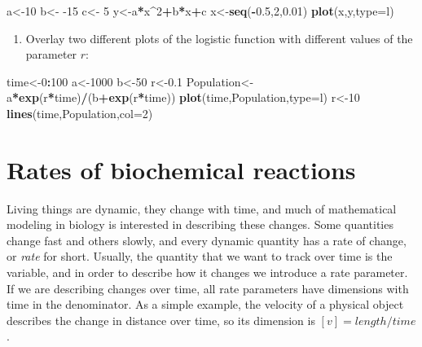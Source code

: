 \documentclass[
]{book}
\newenvironment{Shaded}{\begin{snugshade}}{\end{snugshade}}
\newcommand{\DataTypeTok}[1]{\textcolor[rgb]{0.13,0.29,0.53}{#1}}
\newcommand{\DecValTok}[1]{\textcolor[rgb]{0.00,0.00,0.81}{#1}}
\newcommand{\FloatTok}[1]{\textcolor[rgb]{0.00,0.00,0.81}{#1}}
\newcommand{\KeywordTok}[1]{\textcolor[rgb]{0.13,0.29,0.53}{\textbf{#1}}}
\newcommand{\NormalTok}[1]{#1}
\newcommand{\OperatorTok}[1]{\textcolor[rgb]{0.81,0.36,0.00}{\textbf{#1}}}
\newcommand{\StringTok}[1]{\textcolor[rgb]{0.31,0.60,0.02}{#1}}
\providecommand{\tightlist}{%
  \setlength{\itemsep}{0pt}\setlength{\parskip}{0pt}}
\theoremstyle{definition}
\theoremstyle{definition}
\theoremstyle{definition}
\theoremstyle{remark}
\begin{document}
\begin{Shaded}
\begin{Highlighting}[]
\NormalTok{a\textless{}{-}}\DecValTok{10}
\NormalTok{b\textless{}{-}}\StringTok{ }\DecValTok{{-}15}
\NormalTok{c\textless{}{-}}\StringTok{ }\DecValTok{5}
\NormalTok{y\textless{}{-}a}\OperatorTok{*}\NormalTok{x}\OperatorTok{\^{}}\DecValTok{2}\OperatorTok{+}\NormalTok{b}\OperatorTok{*}\NormalTok{x}\OperatorTok{+}\NormalTok{c}
\NormalTok{x\textless{}{-}}\KeywordTok{seq}\NormalTok{(}\OperatorTok{{-}}\FloatTok{0.5}\NormalTok{,}\DecValTok{2}\NormalTok{,}\FloatTok{0.01}\NormalTok{) }
\KeywordTok{plot}\NormalTok{(x,y,}\DataTypeTok{type=}\StringTok{\textquotesingle{}l\textquotesingle{}}\NormalTok{)}
\end{Highlighting}
\end{Shaded}

\begin{enumerate}
\def\labelenumi{\arabic{enumi}.}
\setcounter{enumi}{5}
\tightlist
\item
  Overlay two different plots of the logistic function with different values of the parameter \(r\):
\end{enumerate}

\begin{Shaded}
\begin{Highlighting}[]
\NormalTok{time\textless{}{-}}\DecValTok{0}\OperatorTok{:}\DecValTok{100}
\NormalTok{a\textless{}{-}}\DecValTok{1000}
\NormalTok{b\textless{}{-}}\DecValTok{50} 
\NormalTok{r\textless{}{-}}\FloatTok{0.1}
\NormalTok{Population\textless{}{-}a}\OperatorTok{*}\KeywordTok{exp}\NormalTok{(r}\OperatorTok{*}\NormalTok{time)}\OperatorTok{/}\NormalTok{(b}\OperatorTok{+}\KeywordTok{exp}\NormalTok{(r}\OperatorTok{*}\NormalTok{time)) }
\KeywordTok{plot}\NormalTok{(time,Population,}\DataTypeTok{type=}\StringTok{\textquotesingle{}l\textquotesingle{}}\NormalTok{) }
\NormalTok{r\textless{}{-}}\DecValTok{10} 
\KeywordTok{lines}\NormalTok{(time,Population,}\DataTypeTok{col=}\DecValTok{2}\NormalTok{)}
\end{Highlighting}
\end{Shaded}

\hypertarget{rates-of-biochemical-reactions}{%
\section{Rates of biochemical reactions}\label{rates-of-biochemical-reactions}}

\label{sec:bio2}

Living things are dynamic, they change with time, and much of mathematical modeling in biology is interested in describing these changes. Some quantities change fast and others slowly, and every dynamic quantity has a rate of change, or \emph{rate} for short. Usually, the quantity that we want to track over time is the variable, and in order to describe how it changes we introduce a rate parameter. If we are describing changes over time, all rate parameters have dimensions with time in the denominator. As a simple example, the velocity of a physical object describes the change in distance over time, so its dimension is \([v] = length/time\).
\end{document}
